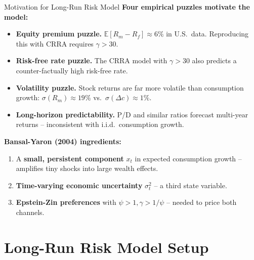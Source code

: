 \documentclass{beamer}
\newcommand{\E}{\mathbb{E}}
\begin{document}
\begin{frame}{Motivation for Long-Run Risk Model}
    \textbf{Four empirical puzzles motivate the model:}
    \begin{itemize}
        \item \textbf{Equity premium puzzle.} $\E[R_m - R_f] \approx 6\%$ in U.S.\ data. Reproducing this with CRRA requires $\gamma > 30$.
        \item \textbf{Risk-free rate puzzle.} The CRRA model with $\gamma > 30$ also predicts a counter-factually high risk-free rate.
        \item \textbf{Volatility puzzle.} Stock returns are far more volatile than consumption growth: $\sigma(R_m) \approx 19\%$ vs.\ $\sigma(\Delta c) \approx 1\%$.
        \item \textbf{Long-horizon predictability.} P/D and similar ratios forecast multi-year returns -- inconsistent with i.i.d.\ consumption growth.
    \end{itemize}
    \vspace{4pt}
    \textbf{Bansal-Yaron (2004) ingredients:}
    \begin{enumerate}
        \item A \textbf{small, persistent component} $x_t$ in expected consumption growth -- amplifies tiny shocks into large wealth effects.
        \item \textbf{Time-varying economic uncertainty} $\sigma_t^2$ -- a third state variable.
        \item \textbf{Epstein-Zin preferences} with $\psi > 1, \gamma > 1/\psi$ -- needed to price both channels.
    \end{enumerate}
\end{frame}

\section{Long-Run Risk Model Setup}
\end{document}
